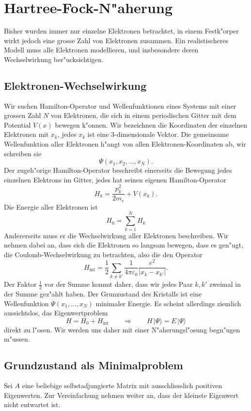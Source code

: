 \section{Hartree-Fock-N"aherung}
Bisher wurden immer nur einzelne Elektronen betrachtet, in einem 
Festk"orper wirkt jedoch eine grosse Zahl von Elektronen zusammen.
Ein realistischeres Modell muss alle Elektronen modellieren, und
insbesondere deren Wechselwirkung ber"ucksichtigen.

\subsection{Elektronen-Wechselwirkung}
Wir suchen Hamilton-Operator und Wellenfunktionen eines Systems mit einer
grossen Zahl $N$ von Elektronen, die sich in einem periodischen Gitter mit dem
Potential $V(x)$ bewegen k"onnen.
Wir bezeichnen die Koordinaten der einzelnen Elektronen mit $x_k$, jedes
$x_k$ ist eine 3-dimensionale Vektor.
Die gemeinsame Wellenfunktion aller Elektronen h"angt von allen
Elektronen-Koordinaten ab, wir schreiben sie
\[
\Psi(x_1,x_2,\dots,x_N).
\]
Der zugeh"orige Hamilton-Operator beschreibt einerseits die Bewegung
jedes einzelnen Elektrons im Gitter, jedes hat seinen eigenen
Hamilton-Operator
\[
H_k=\frac{p_k^2}{2m_e}+V(x_k).
\]
Die Energie aller Elektronen ist
\[
H_0= \sum_{k=1}^N H_k
\]
Andererseits muss er die Wechselwirkung aller Elektronen beschreiben.
Wir nehmen dabei an, dass sich die Elektronen so langsam bewegen, dass
es gen"ugt, die Coulomb-Wechselwirkung zu betrachten, also die den
Operator
\[
H_{\text{int}}
=
\frac12\sum_{k\ne k'}\frac{1}{4\pi\varepsilon_0}\frac{e^2}{|x_k-x_{k'}|}.
\]
Der Faktor $\frac12$ vor der Summe kommt daher, dass wir jedes Paar
$k,k'$ zweimal in der Summe gez"ahlt haben.
Der Grunzustand des Kristalls ist eine Wellenfunktion $\Psi(x_1,\dots,x_N)$
minimaler Energie.
Es scheint allerdings ziemlich aussichtslos, das Eigenwertproblem
\begin{equation}
H=H_0+H_{\text{int}}
\qquad \Rightarrow\qquad
H\,|\Psi\rangle = E\,|\Psi\rangle
\label{skript:multielektronewproblem}
\end{equation}
direkt zu l"osen. Wir werden uns daher mit einer N"aherungsl"osung 
begn"ugen m"ussen.

\subsection{Grundzustand als Minimalproblem}
Sei $A$ eine beliebige selbstadjungierte Matrix mit ausschliesslich
positiven Eigenwerten.
Zur Vereinfachung nehmen weiter an, dass der kleinste Eigenwert nicht 
entwartet ist.

